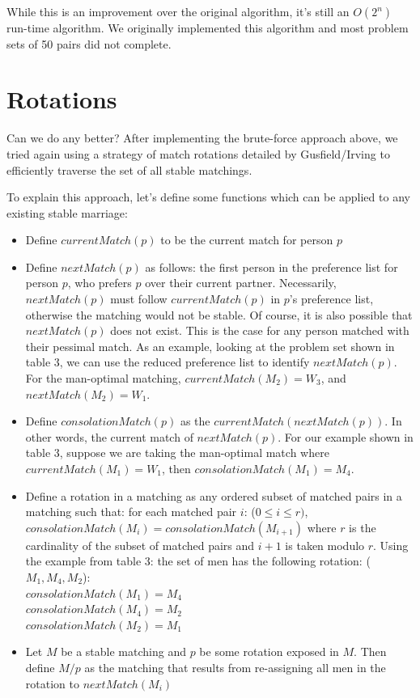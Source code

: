 \documentclass[a4paper]{article}
\begin{document}
While this is an improvement over the original algorithm, it's still an $O(2^n)$ run-time algorithm. We originally implemented this algorithm and most problem sets of 50 pairs did not complete.
\newpage
\section{Rotations}
Can we do any better? After implementing the brute-force approach above, we tried again using a strategy of match rotations detailed by Gusfield/Irving \cite{gusfield} to efficiently traverse the set of all stable matchings.

To explain this approach, let's define some functions which can be applied to any existing stable marriage:
\begin{itemize}
    \item Define $currentMatch(p)$ to be the current match for person $p$
    \item Define $nextMatch(p)$ as follows: the first person in the preference list for person $p$, who prefers $p$ over their current partner. Necessarily, $nextMatch(p)$ must follow $currentMatch(p)$ in $p$'s preference list, otherwise the matching would not be stable. Of course, it is also possible that $nextMatch(p)$ does not exist. This is the case for any person matched with their pessimal match. As an example, looking at the problem set shown in table 3, we can use the reduced preference list to identify $nextMatch(p)$.  For the man-optimal matching, $currentMatch(M_2) = W_3$, and $nextMatch(M_2) = W_1$.
    \item Define $consolationMatch(p)$ as the $currentMatch(nextMatch(p))$. In other words, the current match of $nextMatch(p)$. For our example shown in table 3, suppose we are taking the man-optimal match where $currentMatch(M_1) = W_1$, then $consolationMatch(M_1) = M_4$.
    \item Define a rotation in a matching as any ordered subset of matched pairs in a matching such that: for each matched pair $i$: ($0 \leq i \leq r)$, $consolationMatch(M_i) = consolationMatch (M_{i+1})$ where $r$ is the cardinality of the subset of matched pairs and $i+1$ is taken modulo $r$. Using the example from table 3: the set of men has the following rotation: ($M_1, M_4, M_2$): \\
    $consolationMatch(M_1) = M_4$ \\
    $consolationMatch(M_4) = M_2$ \\
    $consolationMatch(M_2) = M_1$
    \item Let $M$ be a stable matching and $p$ be some rotation exposed in $M$. Then define $M / p$ as the matching that results from re-assigning all men in the rotation to $nextMatch(M_i)$

\end{itemize}
\end{document}
